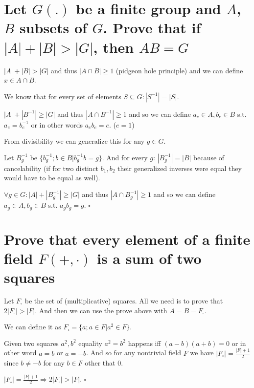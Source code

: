\documentclass[11pt]{article}
\begin{document}
    \part*{Let $G(.)$ be a finite group and $A$, $B$ subsets of $G$.
    Prove that if $|A|+|B|>|G|$, then $AB = G$}

    $|A| + |B| > |G|$ and thus $|A \cap B| \geq 1$ (pidgeon hole principle) and we can define $x \in A \cap B$.

    We know that for every set of elements $S \subseteq G: |S^{-1}| = |S|$.

    $|A| + |B^{-1}| \geq |G|$ and thus $|A \cap B^{-1}| \geq 1$ and so we can define $a_e \in A, b_e \in B$ s.t. $a_e = b_e^{-1}$ or in other words $a_e b_e = e$. ($e = 1$)
    
    From divisibility we can generalize this for any $g \in G$.

    Let $B_g^{-1}$ be $\{b_g^{-1} ; b \in B | b_g^{-1} b = g\}$. And for every $g$: $|B_g^{-1}| = |B|$ because of cancelability (if for two distinct $b_1, b_2$ their generalized inverses were equal they would have to be equal as well).

    $\forall g \in G: |A| + |B_g^{-1}| \geq |G|$ and thus $|A \cap B_g^{-1}| \geq 1$ and so we can define $a_g \in A, b_g \in B$ s.t. $a_g b_g = g$. $\square$
    
    \part*{Prove that every element of a finite field $F(+,\cdot)$ is a sum of two squares}

    Let $F_\square$ be the set of (multiplicative) squares. All we need is to prove that $2|F_\square| > |F|$. And then we can use the prove above with $A = B = F_\square$.

    We can define it as $F_\square = \{a ; a \in F | a^2 \in F\}$.
    
    Given two squares $a^2, b^2$ equality  $a^2 = b^2$ happens iff
    $(a - b)(a + b) = 0$ or in other word $a = b$ or $a = -b$. And so for any nontrivial field $F$ we have $|F_\square| = \frac{|F|+1}{2}$ since $b \neq -b$ for any $b \in F$ other that $0$.

    $|F_\square| = \frac{|F|+1}{2} \Rightarrow 2|F_\square| > |F|$. $\square$
\end{document}
